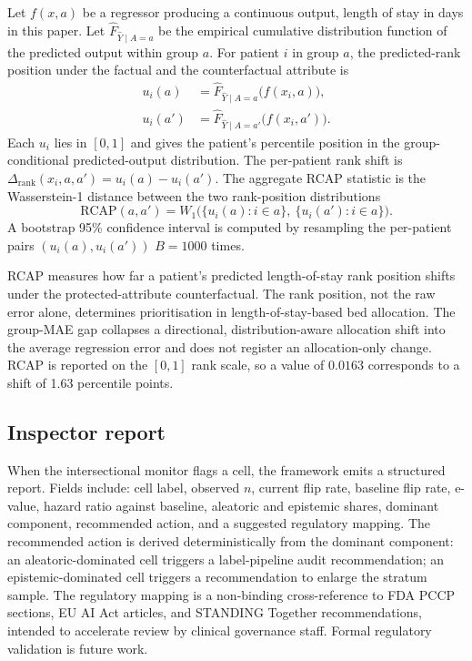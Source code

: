 \documentclass[acmsmall,nonacm,review,anonymous]{acmart}
\newcommand{\1}[1]{\mathbf{1}\!\left\{#1\right\}}
\begin{document}
Let $f(x, a)$ be a regressor producing a continuous output, length of stay in days in this paper. Let $\hat{F}_{\hat{Y} \mid A = a}$ be the empirical cumulative distribution function of the predicted output within group $a$. For patient $i$ in group $a$, the predicted-rank position under the factual and the counterfactual attribute is
\begin{align}
u_i(a)  &= \hat{F}_{\hat{Y} \mid A = a}\bigl(f(x_i, a)\bigr), \\
u_i(a') &= \hat{F}_{\hat{Y} \mid A = a'}\bigl(f(x_i, a')\bigr).
\end{align}
Each $u_i$ lies in $[0, 1]$ and gives the patient's percentile position in the group-conditional predicted-output distribution. The per-patient rank shift is $\Delta_{\mathrm{rank}}(x_i, a, a') = u_i(a) - u_i(a')$. The aggregate RCAP statistic is the Wasserstein-1 distance between the two rank-position distributions
\begin{equation}
\mathrm{RCAP}(a, a') = W_1\bigl(\{u_i(a) : i \in a\},\ \{u_i(a') : i \in a\}\bigr).
\end{equation}
A bootstrap 95\% confidence interval is computed by resampling the per-patient pairs $(u_i(a), u_i(a'))$ $B = 1000$ times.

RCAP measures how far a patient's predicted length-of-stay rank position shifts under the protected-attribute counterfactual. The rank position, not the raw error alone, determines prioritisation in length-of-stay-based bed allocation. The group-MAE gap collapses a directional, distribution-aware allocation shift into the average regression error and does not register an allocation-only change. RCAP is reported on the $[0, 1]$ rank scale, so a value of $0.0163$ corresponds to a shift of 1.63 percentile points.

\subsection{Inspector report}\label{sec:inspector}

When the intersectional monitor flags a cell, the framework emits a structured report. Fields include: cell label, observed $n$, current flip rate, baseline flip rate, e-value, hazard ratio against baseline, aleatoric and epistemic shares, dominant component, recommended action, and a suggested regulatory mapping. The recommended action is derived deterministically from the dominant component: an aleatoric-dominated cell triggers a label-pipeline audit recommendation; an epistemic-dominated cell triggers a recommendation to enlarge the stratum sample. The regulatory mapping is a non-binding cross-reference to FDA PCCP \cite{fda2024pccp} sections, EU AI Act \cite{eu2024aiact} articles, and STANDING Together \cite{ricci2025standing} recommendations, intended to accelerate review by clinical governance staff. Formal regulatory validation is future work.
\end{document}
